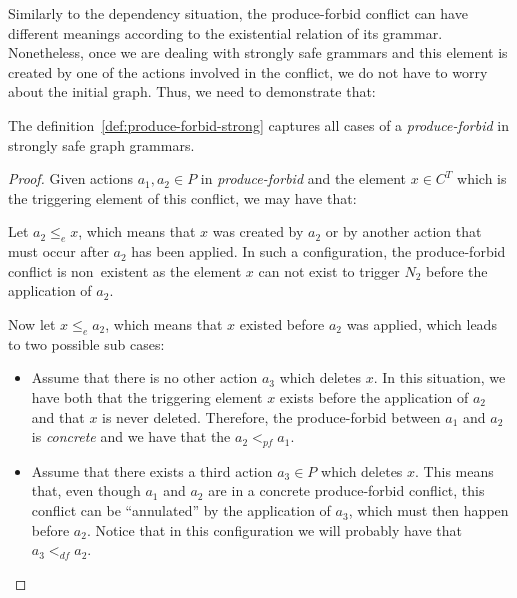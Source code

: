   Similarly to the dependency situation, the produce-forbid conflict can have different meanings according to the existential relation of its grammar. Nonetheless, once we are dealing with strongly safe grammars and this element is created by one of the actions involved in the conflict, we do not have to worry about the initial graph. Thus, we need to demonstrate that:

\begin{thm} The definition~\ref{def:produce-forbid-strong} captures all cases of a \emph{produce-forbid} in strongly safe graph grammars.
\end{thm}

\begin{proof} Given actions $a_1,a_2 \in P$ in \emph{produce-forbid} and the element $x \in C^T$ which is the triggering element of this conflict, we may have that:
\hfill

\begin{description}[style=nextline,leftmargin=*]
  \item[Triggering element is related to the action:]
    Let $a_2 \leq_e x$, which means that $x$ was created by $a_2$ or by another action that must occur after $a_2$ has been applied. In such a configuration, the produce-forbid conflict is \mbox{non existent} as the element $x$ can not exist to trigger $N_2$ before the application of $a_2$.

    Now let $x \leq_e a_2$, which means that $x$ existed before $a_2$ was applied, which leads to two possible sub cases:

    \begin{itemize}
      \item Assume that there is no other action $a_3$ which deletes $x$. In this situation, we have both that the triggering element $x$ exists before the application of $a_2$ and that $x$ is never deleted. Therefore, the produce-forbid between $a_1$ and $a_2$ is \emph{concrete} and we have that the $a_2 <_{pf} a_1$.
      \item Assume that there exists a third action $a_3 \in P$ which deletes $x$. This means that, even though $a_1$ and $a_2$ are in a concrete produce-forbid conflict, this conflict can be ``annulated'' by the application of $a_3$, which must then happen before $a_2$. Notice that in this configuration we will probably have that $a_3 <_{df} a_2$.
    \end{itemize}


\end{description}
\end{proof}

